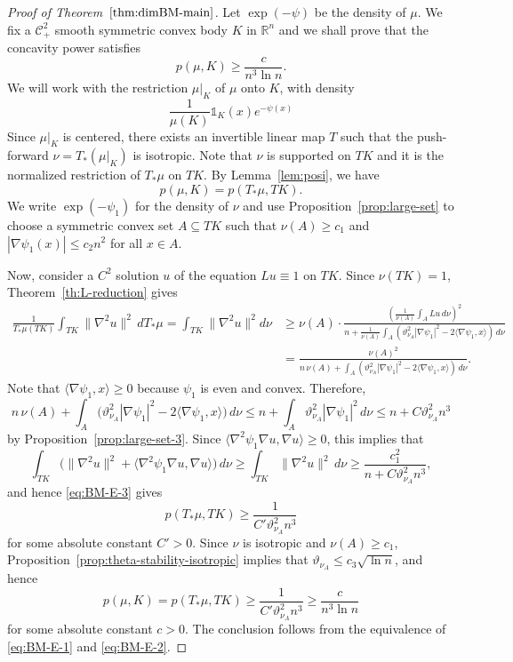 \documentclass[11pt,leqno]{article}
\theoremstyle{definition}
\theoremstyle{remark}
\numberwithin{equation}{section}
\newcommand{\ls}{\leqslant}
\newcommand{\gr}{\geqslant}
\newcommand{\1}{\textbf{1}}
\begin{document}
\begin{proof}[Proof of Theorem~$\ref{thm:dimBM-main}$] Let $\exp(-\psi)$ be the density of $\mu$. We fix a $\mathcal{C}_+^2$ smooth symmetric convex body $K$ in $\mathbb{R}^n$ and we shall prove that the concavity power satisfies
$$p(\mu, K) \gr  \frac{c}{n^3\ln n}.$$
We will work with the restriction $\mu|_{K}$ of $\mu$ onto $K$, with
density $$\frac{1}{\mu(K)}\mathds{1}_K(x)e^{-\psi(x)}$$ Since $\mu|_{K}$ is centered, there exists an invertible linear map $T$ such that the push-forward $\nu=T_*(\mu|_{K})$ is isotropic. Note that $\nu$ is supported on $TK$ and it is the normalized restriction of $T_\ast\mu$ on $TK$. By Lemma~\ref{lem:posi}, we have
$$p(\mu,K) = p(T_\ast\mu, TK).$$
We write $\exp(-\psi_1)$ for the density of $\nu$ and use Proposition~\ref{prop:large-set} to choose a symmetric convex set 
$A\subseteq TK$ such that $\nu(A)\gr c_1$ and $|\nabla\psi_1(x)|\ls c_2n^2$ for all $x\in A$.

Now, consider a $C^2$ solution $u$ of the equation $Lu\equiv 1$ on $TK$. Since $\nu (TK)=1$, Theorem~\ref{th:L-reduction}
gives 
\begin{align*}
\frac{1}{T_\ast\mu(TK)}\int_{TK} \|\nabla^2u\|^2\, d T_\ast\mu =\int_{TK}\|\nabla^2u\|^2d\nu &\gr \nu(A)\cdot\frac{\left(\frac{1}{\nu(A)}\int_ALu\,d\nu\right)^2}{n+\frac{1}{\nu(A)}\int_A(\vartheta_{\nu_A}^2|\nabla \psi_1|^2-2\langle \nabla\psi_1,x\rangle ) \,d\nu}\\
&=\frac{\nu (A)^2}{n\,\nu(A)+\int_A(\vartheta_{\nu_A}^2|\nabla \psi_1|^2-2\langle \nabla\psi_1,x\rangle )\,d\nu}.
\end{align*}
Note that $\langle \nabla\psi_1,x\rangle \gr 0$ because $\psi_1$ is even and convex. Therefore,
$$n\,\nu(A)+\int_A\big(\vartheta_{\nu_A}^2|\nabla \psi_1|^2-2\langle \nabla\psi_1,x\rangle \big)\,d\nu
\ls n+\int_A\vartheta_{\nu_A}^2|\nabla \psi_1|^2\,d\nu
\ls n+C\vartheta_{\nu_A}^2n^3$$
by Proposition~\ref{prop:large-set-3}. Since $\langle\nabla^2\psi_1\nabla u,\nabla u\rangle \gr 0$, this implies that
$$\int_{TK} \big(\|\nabla^2u\|^2+\langle\nabla^2\psi_1\nabla u,\nabla u\rangle\big)\,d\nu \gr\int_{TK}\big\|\nabla^2u\|^2\,d\nu
\gr \frac{c_1^2}{n+C\vartheta_{\nu_A}^2n^3},$$
and hence \eqref{eq:BM-E-3} gives
$$p(T_\ast\mu,TK) \gr  \frac{1}{C'\vartheta_{\nu_A}^2n^3}$$
for some absolute constant $C'>0$. Since $\nu$ is isotropic and $\nu(A)\gr c_1$, Proposition~\ref{prop:theta-stability-isotropic} implies that $\vartheta_{\nu_A}\ls c_3\sqrt{\ln n}$, and hence
$$p(\mu,K) = p(T_\ast\mu, TK) \gr  \frac{1}{C'\vartheta_{\nu_A}^2n^3}\gr \frac{c}{n^3\ln n}$$
for some absolute constant $c>0$. The conclusion follows from the equivalence of \eqref{eq:BM-E-1} and \eqref{eq:BM-E-2}.
\end{proof}
\end{document}
